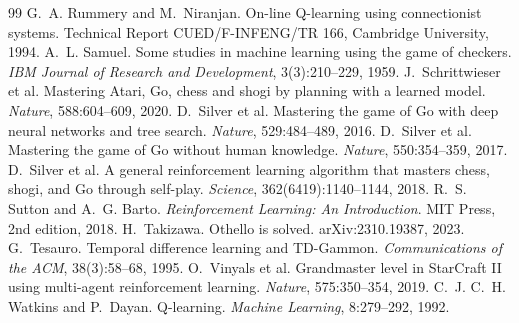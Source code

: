 \documentclass[11pt]{article}
\begin{document}
\begin{thebibliography}{99}
 G.~A. Rummery and M.~Niranjan. On-line Q-learning using connectionist systems. Technical Report CUED/F-INFENG/TR 166, Cambridge University, 1994.
 A.~L. Samuel. Some studies in machine learning using the game of checkers. \emph{IBM Journal of Research and Development}, 3(3):210--229, 1959.
 J.~Schrittwieser et al. Mastering Atari, Go, chess and shogi by planning with a learned model. \emph{Nature}, 588:604--609, 2020.
 D.~Silver et al. Mastering the game of Go with deep neural networks and tree search. \emph{Nature}, 529:484--489, 2016.
 D.~Silver et al. Mastering the game of Go without human knowledge. \emph{Nature}, 550:354--359, 2017.
 D.~Silver et al. A general reinforcement learning algorithm that masters chess, shogi, and Go through self-play. \emph{Science}, 362(6419):1140--1144, 2018.
 R.~S. Sutton and A.~G. Barto. \emph{Reinforcement Learning: An Introduction}. MIT Press, 2nd edition, 2018.
 H.~Takizawa. Othello is solved. arXiv:2310.19387, 2023.
 G.~Tesauro. Temporal difference learning and TD-Gammon. \emph{Communications of the ACM}, 38(3):58--68, 1995.
 O.~Vinyals et al. Grandmaster level in StarCraft II using multi-agent reinforcement learning. \emph{Nature}, 575:350--354, 2019.
 C.~J. C.~H. Watkins and P.~Dayan. Q-learning. \emph{Machine Learning}, 8:279--292, 1992.
\end{thebibliography}
\end{document}
